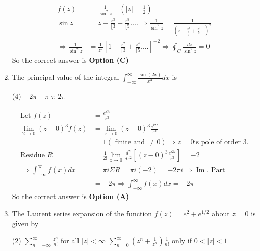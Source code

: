 \begin{enumerate}[label=\color{ocre}\textbf{\arabic*.}]
	\begin{answer}
		\begin{align*}
		f(z)&=\frac{1}{\sin ^{2} z} \quad\left(|z|=\frac{1}{2}\right)\\
		\sin z&=z-\frac{z^{3}}{\lfloor 3}+\frac{z^{5}}{\lfloor 5} \ldots . \Rightarrow \frac{1}{\sin ^{2} z}=\frac{1}{\left(z-\frac{z^{3}}{\frac{3}{3}}+\frac{z^{5}}{5} \cdots\right)^{2}}\\
		\Rightarrow \frac{1}{\sin ^{2} z}&=\frac{1}{z^{2}}\left[1-\frac{z^{2}}{\lfloor 3}+\frac{z^{4}}{\lfloor 5} \ldots .\right]^{-2} \Rightarrow \oint_{C} \frac{d z}{\sin ^{2} z}=0
		\end{align*}
		So the correct answer is \textbf{Option (C)}
	\end{answer}
	\item The principal value of the integral $\int_{-\infty}^{\infty} \frac{\sin (2 x)}{x^{3}} d x$ is
	{}
	\begin{tasks}(4)
		\task[\textbf{A.}] $-2 \pi$
		\task[\textbf{B.}]  $-\pi$
		\task[\textbf{C.}] $\pi$
		\task[\textbf{D.}]  $2 \pi$
	\end{tasks}
	\begin{answer}
		\begin{align*}
		\text{Let }f(z)&=\frac{e^{i 2 z}}{z^{3}}\\
		\lim _{2 \rightarrow 0}(z-0)^{3} f(z)&=\lim _{z \rightarrow 0}(z-0)^{3} \frac{e^{i 2 z}}{z^{3}}\\&=1(\text{ finite and }\neq 0) \Rightarrow z=0 \text{is pole of order 3} .\\
		\text{Residue }R&=\frac{1}{2 !} \lim _{z \rightarrow 0} \frac{d^{2}}{d z^{2}}\left[(z-0)^{3} \frac{e^{i 2 z}}{z^{3}}\right]=-2\\
		\Rightarrow \int_{-\infty}^{\infty} f(x) d x&=\pi i \Sigma R=\pi i(-2)=-2 \pi i \Rightarrow \operatorname{Im} .\text{ Part }\\&=-2 \pi \Rightarrow \int_{-\infty}^{\infty} f(x) d x=-2 \pi
		\end{align*}
		So the correct answer is \textbf{Option (A)}
	\end{answer}
	\item The Laurent series expansion of the function $f(z)=e^{2}+e^{1 / 2}$ about $z=0$ is given by
	{}
	\begin{tasks}(2)
		\task[\textbf{A.}] $\sum_{n=-\infty}^{\infty} \frac{z^{n}}{n !}$ for all $|z|<\infty$
		\task[\textbf{B.}] $\sum_{n=0}^{\infty}\left(z^{n}+\frac{1}{z^{n}}\right) \frac{1}{n !}$ only if $0<|z|<1$

\end{tasks}
\end{enumerate}
